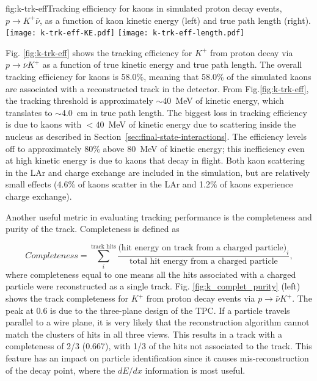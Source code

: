 \begin{dunefigure}{fig:k-trk-eff}{Tracking efficiency for kaons in simulated proton decay events, $p\rightarrow K^{+} \bar{\nu}$, as a function of kaon kinetic energy (left) and true path length (right).}
\texttt{[image: k-trk-eff-KE.pdf]}
\texttt{[image: k-trk-eff-length.pdf]}
\end{dunefigure}

Fig. \ref{fig:k-trk-eff} shows the tracking efficiency for $K^{+}$  from proton decay via $p\rightarrow \bar{\nu}K^{+}$ as a function of true kinetic energy and true path length. The overall tracking efficiency for kaons is 58.0$\%$, meaning that 58.0\% of the simulated kaons are associated with a reconstructed track in the detector.  From Fig.\ref{fig:k-trk-eff}, the tracking threshold is approximately $\sim$40~MeV of kinetic energy, which translates to $\sim$4.0~cm in true path length.  The biggest loss in tracking efficiency is due to kaons with $<40$~MeV of kinetic energy due to scattering inside the nucleus as described in Section~\ref{sec:final-state-interactions}.  The efficiency levels off to approximately $80\%$ above 80~MeV of kinetic energy; this inefficiency even at high kinetic energy is due to kaons that decay in flight.
Both kaon scattering in the LAr and charge exchange are included in the simulation, but are relatively small effects (4.6\% of kaons scatter in the LAr and 1.2$\%$ of kaons experience charge exchange).   

Another useful metric in evaluating tracking performance is the completeness and purity of the track. Completeness is defined as

 \begin{equation}
Completeness = \sum_{i}^{\mbox{track hits}}\frac{\mbox{(hit energy on track from a charged particle)}_{i}}{\mbox{total hit energy from a charged particle}},
\end{equation}
where completeness equal to one means all the hits associated with a charged particle were reconstructed as a single track. 
Fig. \ref{fig:k_complet_purity} (left) shows the track completeness for $K^{+}$ from proton decay events via $p\rightarrow \bar{\nu}K^{+}$. The peak at 0.6 is due to the three-plane design of the TPC.  If a particle travels parallel to a wire plane, it is very likely that the reconstruction algorithm cannot match the \twod clusters of hits in all three views.  This results in a track with a completeness of 2/3 (0.667), with 1/3 of the hits not associated to the track.  This feature has an impact on particle identification since it causes mis-reconstruction of the decay point, where the $dE/dx$ information is most useful.

